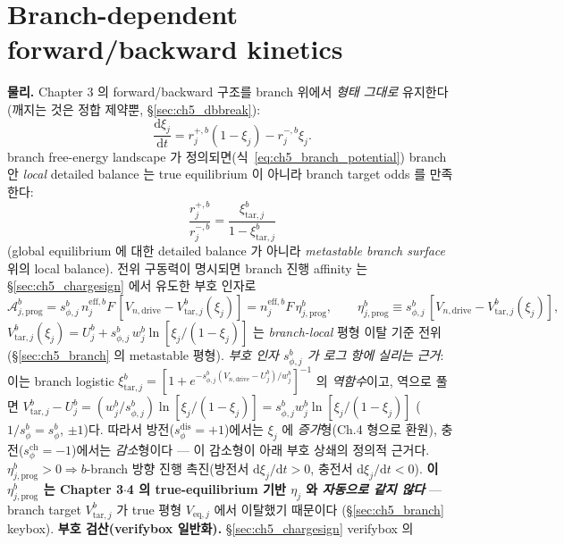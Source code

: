 \documentclass[11pt,a4paper]{article}
\newcommand{\dd}{\mathrm{d}}
\newcommand{\eff}{\mathrm{eff}}
\newcommand{\eq}{\mathrm{eq}}
\newcommand{\drive}{\mathrm{drive}}
\newcommand{\prog}{\mathrm{prog}}
\newcommand{\dis}{\mathrm{dis}}
\newcommand{\chg}{\mathrm{ch}}
\newcommand{\tar}{\mathrm{tar}}
\begin{document}
\section{Branch-dependent forward/backward kinetics}\label{sec:ch5_kinetics}
\textbf{물리.} Chapter 3 의 forward/backward 구조를 branch 위에서 \emph{형태 그대로} 유지한다(깨지는 것은
정합 제약뿐, \S\ref{sec:ch5_dbbreak}):
\begin{equation}
\frac{\dd\xi_j}{\dd t}=r_j^{+,b}(1-\xi_j)-r_j^{-,b}\xi_j.
\label{eq:ch5_branch_fb}
\end{equation}
branch free-energy landscape 가 정의되면(식~\eqref{eq:ch5_branch_potential}) branch 안 \emph{local} detailed
balance 는 true equilibrium 이 아니라 branch target odds 를 만족한다:
\begin{equation}
\frac{r_j^{+,b}}{r_j^{-,b}}=\frac{\xi_{\tar,j}^b}{1-\xi_{\tar,j}^b}
\label{eq:ch5_branch_db}
\end{equation}
(global equilibrium 에 대한 detailed balance 가 아니라 \emph{metastable branch surface} 위의 local balance).
전위 구동력이 명시되면 branch 진행 affinity 는 \S\ref{sec:ch5_chargesign} 에서 유도한 부호 인자로
\begin{equation}
\mathcal A_{j,\prog}^b=s_{\phi,j}^b\,n_j^{\eff,b}F\,[V_{n,\drive}-V_{\tar,j}^b(\xi_j)]=n_j^{\eff,b}F\,\eta_{j,\prog}^b,
\qquad \eta_{j,\prog}^b\equiv s_{\phi,j}^b\,[V_{n,\drive}-V_{\tar,j}^b(\xi_j)],
\label{eq:ch5_branch_affinity}
\end{equation}
$V_{\tar,j}^b(\xi_j)=U_j^b+s_{\phi,j}^b\,w_j^b\ln[\xi_j/(1-\xi_j)]$ 는 \emph{branch-local} 평형 이탈 기준
전위(\S\ref{sec:ch5_branch} 의 metastable 평형). \emph{부호 인자 $s_{\phi,j}^b$ 가 로그 항에 실리는 근거}: 이는
branch logistic $\xi_{\tar,j}^b=[1+e^{-s_{\phi,j}^b(V_{n,\drive}-U_j^b)/w_j^b}]^{-1}$ 의 \emph{역함수}이고, 역으로
풀면 $V_{\tar,j}^b-U_j^b=(w_j^b/s_{\phi,j}^b)\ln[\xi_j/(1-\xi_j)]=s_{\phi,j}^b w_j^b\ln[\xi_j/(1-\xi_j)]$
($1/s_{\phi}^b=s_\phi^b$, $\pm1$)다. 따라서 방전($s_\phi^\dis{=}+1$)에서는 $\xi_j$ 에 \emph{증가}형(Ch.4 형으로 환원),
충전($s_\phi^\chg{=}-1$)에서는 \emph{감소}형이다 — 이 감소형이 아래 부호 상쇄의 정의적 근거다. $\eta_{j,\prog}^b>0\Rightarrow b$-branch 방향 진행 촉진(방전서 $\dd\xi_j/\dd t>0$, 충전서
$\dd\xi_j/\dd t<0$). \textbf{이 $\eta_{j,\prog}^b$ 는 Chapter 3$\cdot$4 의 true-equilibrium 기반 $\eta_j$ 와
\emph{자동으로 같지 않다}} — branch target $V_{\tar,j}^b$ 가 true 평형 $V_{\eq,j}$ 에서 이탈했기 때문이다
(\S\ref{sec:ch5_branch} keybox). \textbf{부호 검산(verifybox 일반화).} \S\ref{sec:ch5_chargesign} verifybox 의
\end{document}
